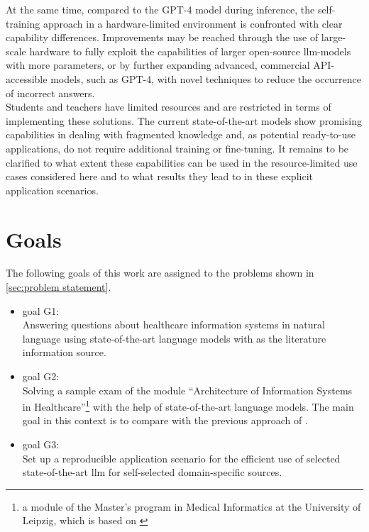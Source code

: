 At the same time, compared to the GPT-4 model during inference, the self-training approach in a hardware-limited environment is confronted with clear capability differences.
%
Improvements may be reached through the use of large-scale hardware to fully exploit the capabilities of larger open-source \ac{llm}-models with more parameters, or by further expanding advanced, commercial API-accessible models, such as GPT-4, with novel techniques to reduce the occurrence of incorrect answers.\\
%
Students and teachers have limited resources and are restricted in terms of implementing these solutions.
The current state-of-the-art models show promising capabilities in dealing with fragmented knowledge and, as potential ready-to-use applications, do not require additional training or fine-tuning. 
It remains to be clarified to what extent these capabilities can be used in the resource-limited use cases considered here and to what results they lead to in these explicit application scenarios.

\section{Goals}\label{sec:goals}
The following goals of this work are assigned to the problems shown in \cref{sec:problem statement}.
\begin{itemize}
  \item goal G1:\\
    Answering questions about healthcare information systems in natural language using state-of-the-art language models with \citet{bb2} as the literature information source. 
  \item goal G2:\\
   Solving a sample exam of the module \enquote{Architecture of Information Systems in Healthcare}\footnote{\raggedright{}a module of the Master's program in Medical Informatics at the University of Leipzig, which is based on \citet{bb2}} with the help of state-of-the-art language models.
   The main goal in this context is to compare with the previous approach of \citet{Paul_Keller} .
   \item goal G3:\\
   Set up a reproducible application scenario for the efficient use of selected state-of-the-art \ac{llm} for self-selected domain-specific sources.
\end{itemize}
